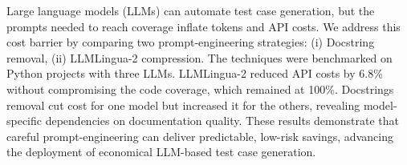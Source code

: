 Large language models (LLMs) can automate test case generation, but the prompts needed to reach coverage inflate tokens and API costs. We address this cost barrier by comparing two prompt-engineering strategies: (i) Docstring removal, (ii) LLMLingua-2 compression. The techniques were benchmarked on Python projects with three LLMs. LLMLingua-2 reduced API costs by 6.8\% without compromising the code coverage, which remained at 100\%. Docstrings removal cut cost for one model but increased it for the others, revealing model-specific dependencies on documentation quality. These results demonstrate that careful prompt-engineering can deliver predictable, low-risk savings, advancing the deployment of economical LLM-based test case generation.
